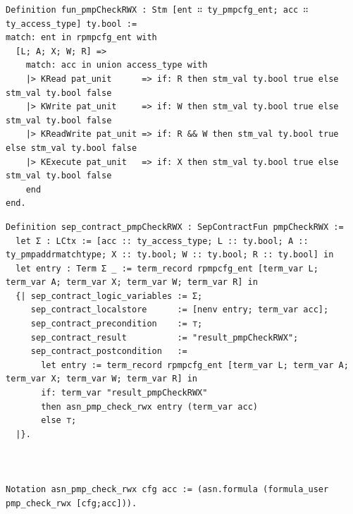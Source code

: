 \begin{lstlisting}[caption=\textmu{}Sail code example, label=lst:microsail_code]
Definition fun_pmpCheckRWX : Stm [ent ∷ ty_pmpcfg_ent; acc ∷ ty_access_type] ty.bool :=
match: ent in rpmpcfg_ent with
  [L; A; X; W; R] =>
    match: acc in union access_type with
    |> KRead pat_unit      => if: R then stm_val ty.bool true else stm_val ty.bool false
    |> KWrite pat_unit     => if: W then stm_val ty.bool true else stm_val ty.bool false
    |> KReadWrite pat_unit => if: R && W then stm_val ty.bool true else stm_val ty.bool false
    |> KExecute pat_unit   => if: X then stm_val ty.bool true else stm_val ty.bool false
    end
end.
\end{lstlisting}

\begin{lstlisting}[caption=The contract for the \textmu{}Sail code, label=lst:microsail_contract]
Definition sep_contract_pmpCheckRWX : SepContractFun pmpCheckRWX :=
  let Σ : LCtx := [acc :: ty_access_type; L :: ty.bool; A :: ty_pmpaddrmatchtype; X :: ty.bool; W :: ty.bool; R :: ty.bool] in
  let entry : Term Σ _ := term_record rpmpcfg_ent [term_var L; term_var A; term_var X; term_var W; term_var R] in
  {| sep_contract_logic_variables := Σ;
     sep_contract_localstore      := [nenv entry; term_var acc];
     sep_contract_precondition    := ⊤;
     sep_contract_result          := "result_pmpCheckRWX";
     sep_contract_postcondition   :=
       let entry := term_record rpmpcfg_ent [term_var L; term_var A; term_var X; term_var W; term_var R] in
       if: term_var "result_pmpCheckRWX"
       then asn_pmp_check_rwx entry (term_var acc)
       else ⊤;
  |}.



Notation asn_pmp_check_rwx cfg acc := (asn.formula (formula_user pmp_check_rwx [cfg;acc])).
\end{lstlisting}
